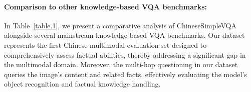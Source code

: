 
\paragraph{Comparison to other knowledge-based VQA benchmarks:}
In Table~\ref{table.1}, we present a comparative analysis of ChineseSimpleVQA alongside several mainstream knowledge-based VQA benchmarks. Our dataset represents the first Chinese multimodal evaluation set designed to comprehensively assess factual abilities, thereby addressing a significant gap in the multimodal domain.
Moreover, the multi-hop questioning in our dataset queries the image's content and related facts, effectively evaluating the model's object recognition and factual knowledge handling.


